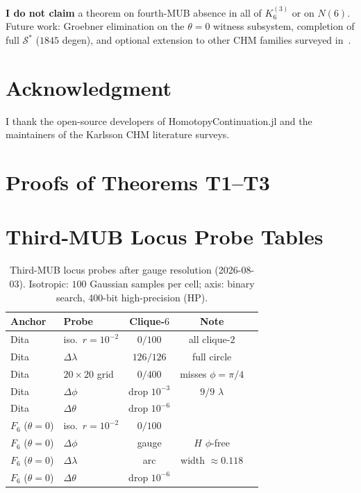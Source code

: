 \documentclass[onecolumn]{IEEEtran}
\begin{document}
\textbf{I do not claim} a theorem on fourth-MUB absence in all of $K_6^{(3)}$ or on $N(6)$.
Future work: Groebner elimination on the $\theta{=}0$ witness subsystem, completion of full $\mathcal{S}^*$ ($1845$ degen), and optional extension to other CHM families surveyed in~\cite{McNulty2024}.

\newpage
\section*{Acknowledgment}
I thank the open-source developers of HomotopyContinuation.jl and the maintainers of the Karlsson CHM literature surveys.

\appendices
\section{Proofs of Theorems T1--T3}
\label{sec:proofs}




\section{Third-MUB Locus Probe Tables}
\label{app:probes}

\begin{table}[h]
\caption{Third-MUB locus probes after gauge resolution (2026-08-03). Isotropic: $100$ Gaussian samples per cell; axis: binary search, 400-bit high-precision (HP).}
\label{tab:locusdim}
\centering
\footnotesize
\setlength{\tabcolsep}{2.5pt}
\begin{tabular}{@{}>{\raggedright\arraybackslash}p{0.48in}>{\raggedright\arraybackslash}p{0.62in}cc>{\raggedright\arraybackslash}p{0.72in}@{}}
\toprule
Anchor & Probe & Clique-$6$ & Note \\
\midrule
Dita & iso.\ $r{=}10^{-2}$ & $0/100$ & all clique-$2$ \\
Dita & $\Delta\lambda$ & $126/126$ & full circle \\
Dita & $20{\times}20$ grid & $0/400$ & misses $\phi{=}\pi/4$ \\
Dita & $\Delta\phi$ & drop $10^{-3}$ & $9/9$ $\lambda$ \\
Dita & $\Delta\theta$ & drop $10^{-6}$ & \\
$F_6$ ($\theta{=}0$) & iso.\ $r{=}10^{-2}$ & $0/100$ & \\
$F_6$ ($\theta{=}0$) & $\Delta\phi$ & gauge & $H$ $\phi$-free \\
$F_6$ ($\theta{=}0$) & $\Delta\lambda$ & arc & width $\approx0.118$ \\
$F_6$ ($\theta{=}0$) & $\Delta\theta$ & drop $10^{-6}$ & \\
\bottomrule
\end{tabular}
\end{table}
\end{document}
